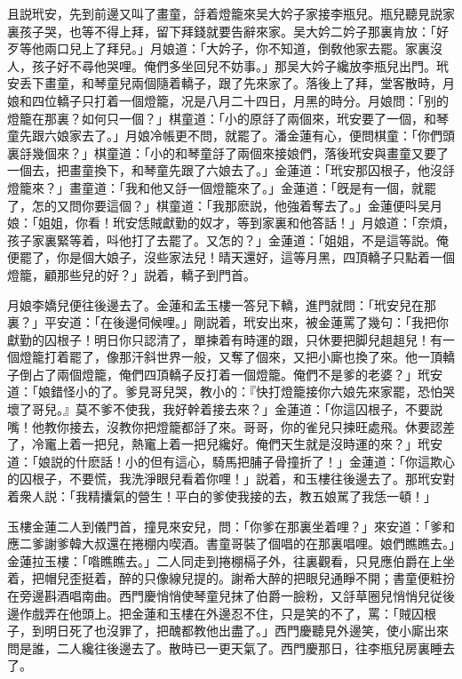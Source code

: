 且説玳安，先到前邊又叫了畫童，㧱着燈籠來吴大妗子家接李瓶兒。瓶兒聽見説家裏孩子哭，也等不得上拜，留下拜錢就要告辭來家。吴大妗二妗子那裏肯放：「好歹等他兩口兒上了拜兒。」月娘道：「大妗子，你不知道，倒敎他家去罷。家裏沒人，孩子好不尋他哭哩。俺們多坐回兒不妨事。」那吴大妗子纔放李瓶兒出門。玳安丢下畫童，和琴童兒兩個隨着轎子，跟了先來家了。落後上了拜，堂客散時，月娘和四位轎子只打着一個燈籠，况是八月二十四日，月黑的時分。月娘問：「别的燈籠在那裏？如何只一個？」棋童道：「小的原㧱了兩個來，玳安要了一個，和琴童先跟六娘家去了。」月娘冷帳更不問，就罷了。潘金蓮有心，便問棋童：「你們頭裏㧱幾個來？」棋童道：「小的和琴童㧱了兩個來接娘們，落後玳安與畫童又要了一個去，把畫童換下，和琴童先跟了六娘去了。」金蓮道：「玳安那囚根子，他沒㧱燈籠來？」畫童道：「我和他又㧱一個燈籠來了。」金蓮道：「旣是有一個，就罷了，怎的又問你要這個？」棋童道：「我那麽説，他強着奪去了。」金蓮便呌吴月娘：「姐姐，你看！玳安恁賊獻勤的奴才，等到家裏和他答話！」月娘道：「奈煩，孩子家裏緊等着，呌他打了去罷了。又怎的？」金蓮道：「姐姐，不是這等説。俺便罷了，你是個大娘子，沒些家法兒！晴天還好，這等月黑，四頂轎子只點着一個燈籠，顧那些兒的好？」説着，轎子到門首。

月娘李嬌兒便往後邊去了。金蓮和孟玉樓一答兒下轎，進門就問：「玳安兒在那裏？」平安道：「在後邊伺候哩。」剛説着，玳安出來，被金蓮罵了幾句：「我把你獻勤的囚根子！明日你只認清了，單揀着有時運的跟，只休要把脚兒趄趄兒！有一個燈籠打着罷了，像那汗斜世界一般，又奪了個來，又把小廝也換了來。他一頂轎子倒占了兩個燈籠，俺們四頂轎子反打着一個燈籠。俺們不是爹的老婆？」玳安道：「娘錯怪小的了。爹見哥兒哭，教小的：『快打燈籠接你六娘先來家罷，恐怕哭壞了哥兒。』莫不爹不使我，我好幹着接去來？」金蓮道：「你這囚根子，不要説嘴！他教你接去，沒教你把燈籠都㧱了來。哥哥，你的雀兒只揀旺處飛。休要認差了，冷竃上着一把兒，熱竃上着一把兒纔好。俺們天生就是沒時運的來？」玳安道：「娘説的什麽話！小的但有這心，騎馬把脯子骨撞折了！」金蓮道：「你這欺心的囚根子，不要慌，我洗淨眼兒看着你哩！」説着，和玉樓往後邊去了。那玳安對着衆人説：「我精攮氣的營生！平白的爹使我接的去，教五娘駡了我恁一頓！」

玉樓金蓮二人到儀門首，撞見來安兒，問：「你爹在那裏坐着哩？」來安道：「爹和應二爹謝爹韓大叔還在捲棚内喫酒。書童哥裝了個唱的在那裏唱哩。娘們瞧瞧去。」金蓮拉玉樓：「喒瞧瞧去。」二人同走到捲棚槅子外，往裏觀看，只見應伯爵在上坐着，把帽兒歪挺着，醉的只像線兒提的。謝希大醉的把眼兒通睜不開；書童便粧扮在旁邊斟酒唱南曲。西門慶悄悄使琴童兒抹了伯爵一臉粉，又㧱草圈兒悄悄兒従後邊作戲弄在他頭上。把金蓮和玉樓在外邊忍不住，只是笑的不了，罵：「賊囚根子，到明日死了也沒罪了，把醜都教他出盡了。」西門慶聽見外邊笑，使小廝出來問是誰，二人纔往後邊去了。散時已一更天氣了。西門慶那日，往李瓶兒房裏睡去了。

